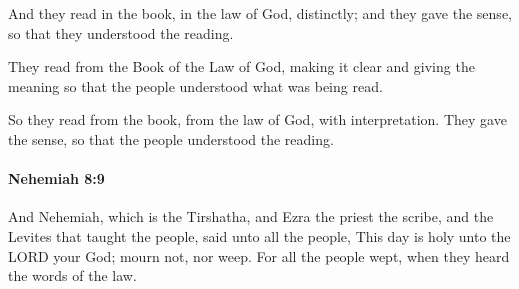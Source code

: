 			\begin{versebox}
					\item[BHS] 
					\item[LXX] 
					\item[ASV] And they read in the book, in the law of God, distinctly; and they gave the sense, so that they understood the reading.
					\item[NIV] They read from the Book of the Law of God, making it clear and giving the meaning so that the people understood what was being read.
					\item[NRSV] So they read from the book, from the law of God, with interpretation. They gave the sense, so that the people understood the reading.
			\end{versebox}

		\paragraph{Nehemiah 8:9} %
			\label{NEHEMIAH-8-9}

			And Nehemiah, which is the Tirshatha, and Ezra the priest the scribe, and the Levites that taught the people, said unto all the people, This day is holy unto the LORD your God; mourn not, nor weep. For all the people wept, when they heard the words of the law.

